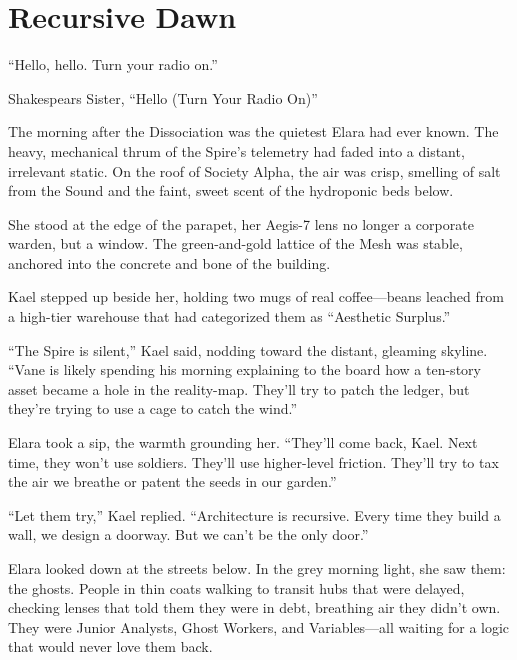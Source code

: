 
\chapter{Recursive Dawn}
\epigraph{``Hello, hello. Turn your radio on.''}{Shakespears Sister, “Hello (Turn Your Radio On)”}

The morning after the Dissociation was the quietest Elara had ever known. The heavy, mechanical thrum of the Spire’s telemetry had faded into a distant, irrelevant static. On the roof of Society Alpha, the air was crisp, smelling of salt from the Sound and the faint, sweet scent of the hydroponic beds below. 

She stood at the edge of the parapet, her Aegis-7 lens no longer a corporate warden, but a window. The green-and-gold lattice of the Mesh was stable, anchored into the concrete and bone of the building. 


Kael stepped up beside her, holding two mugs of real coffee—beans leached from a high-tier warehouse that had categorized them as ``Aesthetic Surplus.''

``The Spire is silent,'' Kael said, nodding toward the distant, gleaming skyline. ``Vane is likely spending his morning explaining to the board how a ten-story asset became a hole in the reality-map. They’ll try to patch the ledger, but they’re trying to use a cage to catch the wind.''

Elara took a sip, the warmth grounding her. ``They’ll come back, Kael. Next time, they won't use soldiers. They’ll use higher-level friction. They’ll try to tax the air we breathe or patent the seeds in our garden.''

``Let them try,'' Kael replied. ``Architecture is recursive. Every time they build a wall, we design a doorway. But we can't be the only door.''



Elara looked down at the streets below. In the grey morning light, she saw them: the ghosts. People in thin coats walking to transit hubs that were delayed, checking lenses that told them they were in debt, breathing air they didn't own. They were Junior Analysts, Ghost Workers, and Variables—all waiting for a logic that would never love them back.

